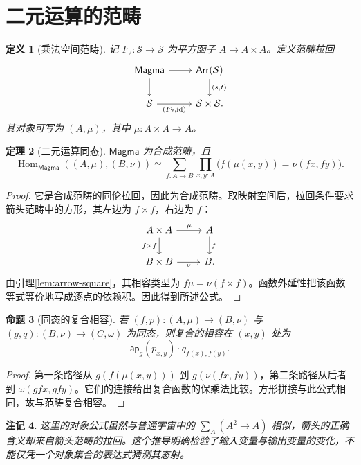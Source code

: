 \documentclass[12pt,oneside,openany,fontset=none]{ctexbook}
\theoremstyle{cn}
\newtheorem{definition}{定义}[chapter]
\newtheorem{proposition}[definition]{命题}
\newtheorem{theorem}[definition]{定理}
\newtheorem{remark}[definition]{注记}
\numberwithin{equation}{chapter}
\newcommand{\Sp}{\mathcal S}
\newcommand{\id}{\operatorname{id}}
\newcommand{\Hom}{\operatorname{Hom}}
\newcommand{\ap}{\mathsf{ap}}
\newcommand{\Magma}{\mathsf{Magma}}
\begin{document}
\section{二元运算的范畴}
\begin{definition}[乘法空间范畴]
记 $F_2:\Sp\to\Sp$ 为平方函子 $A\mapsto A\times A$。定义范畴拉回
\[
\begin{tikzcd}
\Magma\ar[r]\ar[d]&\mathsf{Arr}(\Sp)\ar[d,"{(s,t)}"]\\
\Sp\ar[r,"{(F_2,\id)}"']&\Sp\times\Sp.
\end{tikzcd}
\]
其对象可写为 $(A,\mu)$，其中 $\mu:A\times A\to A$。
\end{definition}
\begin{theorem}[二元运算同态]\label{thm:magma-hom}
$\Magma$ 为合成范畴，且
\[
\Hom_{\Magma}((A,\mu),(B,\nu))
\simeq
\sum_{f:A\to B}\prod_{x,y:A}
\bigl(f(\mu(x,y))=\nu(fx,fy)\bigr).
\]
\end{theorem}
\begin{proof}
它是合成范畴的同伦拉回，因此为合成范畴。取映射空间后，拉回条件要求箭头范畴中的方形，其左边为 $f\times f$，右边为 $f$：
\[
\begin{tikzcd}
A\times A\ar[r,"\mu"]\ar[d,"f\times f"']&A\ar[d,"f"]\\
B\times B\ar[r,"\nu"']&B.
\end{tikzcd}
\]
由引理\ref{lem:arrow-square}，其相容类型为 $f\mu=\nu(f\times f)$。函数外延性把该函数等式等价地写成逐点的依赖积。因此得到所述公式。
\end{proof}
\begin{proposition}[同态的复合相容]
若 $(f,p):(A,\mu)\to(B,\nu)$ 与 $(g,q):(B,\nu)\to(C,\omega)$ 为同态，则复合的相容在 $(x,y)$ 处为
\[
\ap_g(p_{x,y})\cdot q_{f(x),f(y)}.
\]
\end{proposition}
\begin{proof}
第一条路径从 $g(f(\mu(x,y)))$ 到 $g(\nu(fx,fy))$，第二条路径从后者到 $\omega(gfx,gfy)$。它们的连接给出复合函数的保乘法比较。方形拼接与此公式相同，故与范畴复合相容。
\end{proof}
\begin{remark}
这里的对象公式虽然与普通宇宙中的 $\sum_A(A^2\to A)$ 相似，箭头的正确含义却来自箭头范畴的拉回。这个推导明确检验了输入变量与输出变量的变化，不能仅凭一个对象集合的表达式猜测其态射。
\end{remark}
\end{document}
